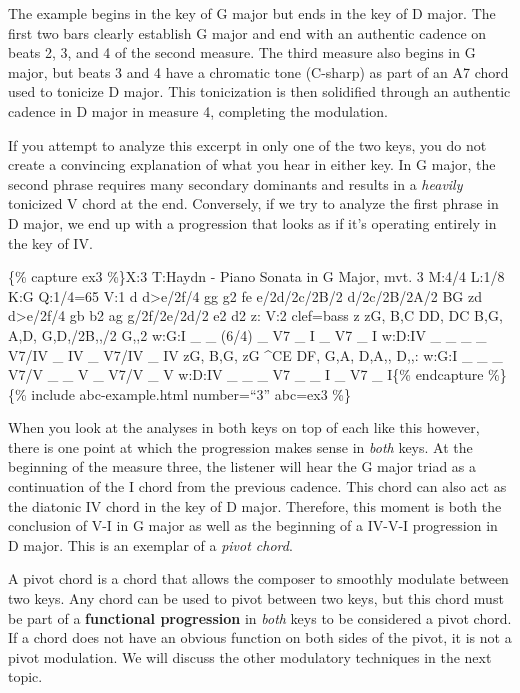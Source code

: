 \documentclass{book}
\begin{document}
The example begins in the key of G major but ends in the key of D major. The
first two bars clearly establish G major and end with an authentic cadence on
beats 2, 3, and 4 of the second measure. The third measure also begins in G
major, but beats 3 and 4 have a chromatic tone (C-sharp) as part of an A7
chord used to tonicize D major. This tonicization is then solidified through
an authentic cadence in D major in measure 4, completing the modulation.

If you attempt to analyze this excerpt in only one of the two keys, you do not
create a convincing explanation of what you hear in either key. In G major,
the second phrase requires many secondary dominants and results in a
\emph{heavily} tonicized V chord at the end. Conversely, if we try to analyze
the first phrase in D major, we end up with a progression that looks as if
it's operating entirely in the key of IV.

\{\% capture ex3 \%\}X:3 T:Haydn - Piano Sonata in G Major, mvt. 3 M:4/4 L:1/8
K:G Q:1/4=65 V:1 d\textbar{} d\textgreater e/2f/4 gg g2 fe\textbar{}
e/2d/2c/2B/2 d/2c/2B/2A/2 BG zd\textbar{} d\textgreater e/2f/4 gb b2
ag\textbar{} g/2f/2e/2d/2 e2 d2 z:\textbar{]} V:2 clef=bass z\textbar{} zG,
B,C DD, DC\textbar{} B,G, A,D, G,D,/2B,,/2 G,,2\textbar{} w:G:I \_ \_ (6/4) \_
V7 \_ I \_ V7 \_ I w:D:IV \_ \_ \_ \_ V7/IV \_ IV \_ V7/IV \_ IV zG, B,G, zG
\^{}CE\textbar{} DF, G,A, D,A,, D,,:\textbar{]} w:G:I \_ \_ \_ V7/V \_ \_ V \_
V7/V \_ V w:D:IV \_ \_ \_ V7 \_ \_ I \_ V7 \_ I\{\% endcapture \%\} \{\%
include abc-example.html number=``3'' abc=ex3 \%\}

When you look at the analyses in both keys on top of each like this however,
there is one point at which the progression makes sense in \emph{both} keys.
At the beginning of the measure three, the listener will hear the G major
triad as a continuation of the I chord from the previous cadence. This chord
can also act as the diatonic IV chord in the key of D major. Therefore, this
moment is both the conclusion of V-I in G major as well as the beginning of a
IV-V-I progression in D major. This is an exemplar of a \emph{pivot chord}.

A pivot chord is a chord that allows the composer to smoothly modulate between
two keys. Any chord can be used to pivot between two keys, but this chord must
be part of a \textbf{functional progression} in \emph{both} keys to be
considered a pivot chord. If a chord does not have an obvious function on both
sides of the pivot, it is not a pivot modulation. We will discuss the other
modulatory techniques in the next topic.
\end{document}

